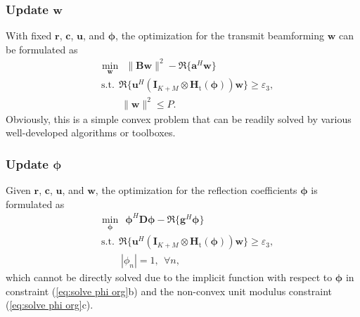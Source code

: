 \documentclass[Conference,a4paper]{IEEEtran}
\begin{document}
\subsubsection{Update $\mathbf{w}$}

With fixed $\mathbf{r}$, $\mathbf{c}$, $\mathbf{u}$, and $\bm{\phi}$, the optimization for the transmit beamforming $\mathbf{w}$ can be formulated as
\begin{subequations}\label{eq:solve W}
\begin{align}
&\underset{\mathbf{w}}\min~~\|\mathbf{B}\mathbf{w}\|^2 -\Re\{\mathbf{a}^H\mathbf{w}\}\\
&~\text{s.t.}~~\Re\{\mathbf{u}^H(\mathbf{I}_{K+M}\otimes\mathbf{H}_\text{t}(\bm{\phi}))\mathbf{w}\} \geq \varepsilon_3,\\
&\quad\quad~\|\mathbf{w}\|^2 \leq P.
\end{align}
\end{subequations}
Obviously, this is a simple convex problem that can be readily solved by various well-developed algorithms or toolboxes.

\subsubsection{Update $\bm{\phi}$}

Given $\mathbf{r}$, $\mathbf{c}$, $\mathbf{u}$, and $\mathbf{w}$, the optimization for the reflection coefficients $\bm{\phi}$ is formulated as
\begin{subequations}\label{eq:solve phi org}
\begin{align}
&\underset{\bm{\phi}}\min~~\bm{\phi}^H\mathbf{D}\bm{\phi}-\Re\{\mathbf{g}^H\bm{\phi}\}\\
&~\text{s.t.}~~\Re\{\mathbf{u}^H(\mathbf{I}_{K+M}\otimes\mathbf{H}_\text{t}(\bm{\phi}))\mathbf{w}\} \geq \varepsilon_3,\\
&\quad\quad~|\phi_n| = 1,~~\forall n,
\end{align}
\end{subequations}
which cannot be directly solved due to the implicit function with respect to $\bm{\phi}$ in constraint (\ref{eq:solve phi org}b) and the non-convex unit modulus constraint (\ref{eq:solve phi org}c).
\end{document}
